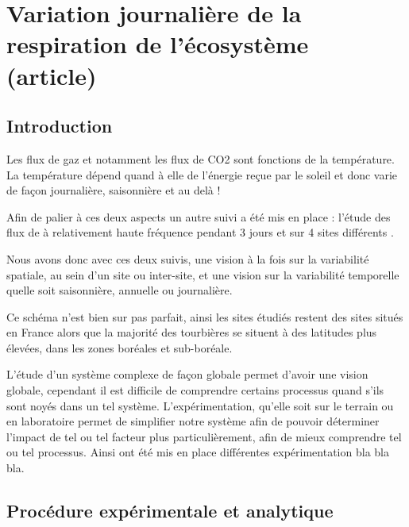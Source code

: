 \chapter{Variation journalière de la respiration de l'écosystème (article)}
\newpage

\section{Introduction}
Les flux de gaz et notamment les flux de CO2 sont fonctions de la température.
La température dépend quand à elle de l'énergie reçue par le soleil et donc varie de façon journalière, saisonnière et au delà !

Afin de palier à ces deux aspects un autre suivi a été mis en place : l'étude des flux de \coo à relativement haute fréquence  pendant 3 jours et sur 4 sites différents .

Nous avons donc avec ces deux suivis, une vision à la fois sur la variabilité spatiale, au sein d'un site ou inter-site, et une vision sur la variabilité temporelle quelle soit saisonnière, annuelle ou journalière.

Ce schéma n'est bien sur pas parfait, ainsi les sites étudiés restent des sites situés en France alors que la majorité des tourbières se situent à des latitudes plus élevées, dans les zones boréales et sub-boréale.


L'étude d'un système complexe de façon globale permet d'avoir une vision globale, cependant il est difficile de comprendre certains processus quand s'ils sont noyés dans un tel système. 
L'expérimentation, qu'elle soit sur le terrain ou en laboratoire permet de simplifier notre système afin de pouvoir déterminer l'impact de tel ou tel facteur plus particulièrement, afin de mieux comprendre tel ou tel processus.
Ainsi ont été mis en place différentes expérimentation bla bla bla.

\section{Procédure expérimentale et analytique}

